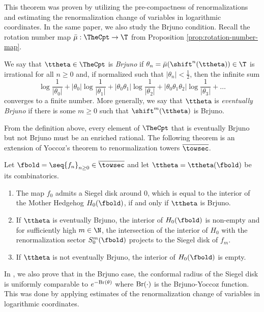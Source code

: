 \documentclass{amsart}
\begin{document}
This theorem was proven by utilizing the pre-compactness of renormalizations and estimating the renormalization change of variables in logarithmic coordinates.
In the same paper, we also study the Brjuno condition.
Recall the rotation number map $\bar{\mu}: \TheCpt \to \T$ from Proposition \ref{prop:rotation-number-map}.

\begin{definition}
    We say that $\ttheta \in \TheCpt$ is \emph{Brjuno} if $\theta_n = \bar{\mu}(\shift^n(\ttheta)) \in \T$ is irrational for all $n \geq 0$ and, if normalized such that $|\theta_n| < \frac{1}{2}$, then the infinite sum
\[
    \log\frac{1}{|\theta_0|} + |\theta_0| \log\frac{1}{|\theta_1|} + |\theta_0\theta_1| \log\frac{1}{|\theta_2|} + |\theta_0\theta_1\theta_2| \log\frac{1}{|\theta_3|} +\ldots
\]
    converges to a finite number.
    More generally, we say that $\ttheta$ is \emph{eventually Brjuno} if there is some $m \geq 0$ such that $\shift^m(\ttheta)$ is Brjuno.
\end{definition}

From the definition above, every element of $\TheCpt$ that is eventually Brjuno but not Brjuno must be an enriched rational.
The following theorem is an extension of Yoccoz's theorem \cite{Yoc95} to renormalization towers $\overline{\towsec}$.

\begin{theorem}
\label{thm:eventually-brjuno}
    Let $\fbold = \seq{f_n}_{n\geq 0} \in \overline{\towsec}$ and let $\ttheta = \ttheta(\fbold)$ be its combinatorics.
    \begin{enumerate}
        \item The map $f_0$ admits a Siegel disk around $0$, which is equal to the interior of the Mother Hedgehog $H_0(\fbold)$, if and only if $\ttheta$ is Brjuno.
        \item If $\ttheta$ is eventually Brjuno, the interior of $H_0(\fbold)$ is non-empty and for sufficiently high $m \in \N$, the intersection of the interior of $H_0$ with the renormalization sector $S_0^m(\fbold)$ projects to the Siegel disk of $f_m$.
        \item If $\ttheta$ is not eventually Brjuno, the interior of $H_0(\fbold)$ is empty.
    \end{enumerate}
\end{theorem}

In \cite{Lim26b}, we also prove that in the Brjuno case, the conformal radius of the Siegel disk is uniformly comparable to $e^{-\textnormal{Br}(\theta)}$ where $\textnormal{Br}(\cdot)$ is the Brjuno-Yoccoz function.
This was done by applying estimates of the renormalization change of variables in logarithmic coordinates.
\end{document}
